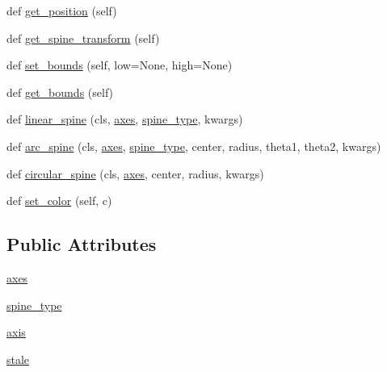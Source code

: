 \begin{DoxyCompactItemize}
\item 
def \hyperlink{classmatplotlib_1_1spines_1_1Spine_ac1de348f01ae7911ff3260b518679a48}{get\+\_\+position} (self)
\item 
def \hyperlink{classmatplotlib_1_1spines_1_1Spine_aa0bce1fafed13acc43dddcf36d551dd8}{get\+\_\+spine\+\_\+transform} (self)
\item 
def \hyperlink{classmatplotlib_1_1spines_1_1Spine_af4ff86391ad667e80f77b21796c85939}{set\+\_\+bounds} (self, low=None, high=None)
\item 
def \hyperlink{classmatplotlib_1_1spines_1_1Spine_afb9741480bc224e21ce36761fa31037e}{get\+\_\+bounds} (self)
\item 
def \hyperlink{classmatplotlib_1_1spines_1_1Spine_ab3eb1068c4f8d867665792a470eb8957}{linear\+\_\+spine} (cls, \hyperlink{classmatplotlib_1_1spines_1_1Spine_ae26d71c41d1ef631eb7597043354aa97}{axes}, \hyperlink{classmatplotlib_1_1spines_1_1Spine_abb817da882414260900608ca76c1188a}{spine\+\_\+type}, kwargs)
\item 
def \hyperlink{classmatplotlib_1_1spines_1_1Spine_a1e032bbe9a84985351d9faa8fbed4d82}{arc\+\_\+spine} (cls, \hyperlink{classmatplotlib_1_1spines_1_1Spine_ae26d71c41d1ef631eb7597043354aa97}{axes}, \hyperlink{classmatplotlib_1_1spines_1_1Spine_abb817da882414260900608ca76c1188a}{spine\+\_\+type}, center, radius, theta1, theta2, kwargs)
\item 
def \hyperlink{classmatplotlib_1_1spines_1_1Spine_a1d1747fc8caedf0b65b331e6289e0e05}{circular\+\_\+spine} (cls, \hyperlink{classmatplotlib_1_1spines_1_1Spine_ae26d71c41d1ef631eb7597043354aa97}{axes}, center, radius, kwargs)
\item 
def \hyperlink{classmatplotlib_1_1spines_1_1Spine_afe8c85bc9f4226c1095d2066b4e58d28}{set\+\_\+color} (self, c)
\end{DoxyCompactItemize}
\subsection*{Public Attributes}
\begin{DoxyCompactItemize}
\item 
\hyperlink{classmatplotlib_1_1spines_1_1Spine_ae26d71c41d1ef631eb7597043354aa97}{axes}
\item 
\hyperlink{classmatplotlib_1_1spines_1_1Spine_abb817da882414260900608ca76c1188a}{spine\+\_\+type}
\item 
\hyperlink{classmatplotlib_1_1spines_1_1Spine_afa70f77dfe170ddd16528b4be0561194}{axis}
\item 
\hyperlink{classmatplotlib_1_1spines_1_1Spine_a004a576fe628dd970e90c98c5a7b6dbd}{stale}
\end{DoxyCompactItemize}
